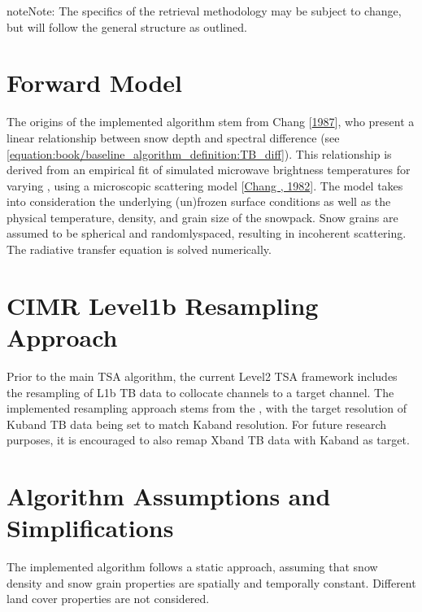 \documentclass[letterpaper,10pt,english]{jupyterBook}
\begin{document}
\begin{sphinxadmonition}{note}{Note:}
\sphinxAtStartPar
The specifics of the retrieval methodology may be subject to change, but will follow the general structure as outlined.
\end{sphinxadmonition}


\section{Forward Model}
\label{\detokenize{book/baseline_algorithm_definition:forward-model}}
\sphinxAtStartPar
The origins of the implemented algorithm stem from Chang  {[}\hyperlink{cite.book/references:id7}{1987}{]}, who present a linear relationship between snow depth and spectral difference (see \eqref{equation:book/baseline_algorithm_definition:TB_diff}).
This relationship is derived from an empirical fit of simulated microwave brightness temperatures for varying {\hyperref[\detokenize{book/acronyms:term-SWE}]{}}, using a microscopic scattering model {[}\hyperlink{cite.book/references:id23}{Chang , 1982}{]}.
The model takes into consideration the underlying (un\sphinxhyphen{})frozen surface conditions as well as the physical temperature, density, and grain size of the snowpack.
Snow grains are assumed to be spherical and randomly\sphinxhyphen{}spaced, resulting in incoherent scattering.
The radiative transfer equation is solved numerically.


\section{CIMR Level\sphinxhyphen{}1b Resampling Approach}
\label{\detokenize{book/baseline_algorithm_definition:cimr-level-1b-resampling-approach}}
\sphinxAtStartPar
Prior to the main TSA algorithm, the current {\hyperref[\detokenize{book/acronyms:term-CIMR}]{}} Level\sphinxhyphen{}2 TSA framework includes the resampling of L1b TB data to collocate channels to a target channel.
The implemented resampling approach stems from the , with the target resolution of Ku\sphinxhyphen{}band TB data being set to match Ka\sphinxhyphen{}band resolution.
For future research purposes, it is encouraged to also remap X\sphinxhyphen{}band TB data with Ka\sphinxhyphen{}band as target.


\section{Algorithm Assumptions and Simplifications}
\label{\detokenize{book/baseline_algorithm_definition:algorithm-assumptions-and-simplifications}}
\sphinxAtStartPar
The implemented algorithm follows a static approach, assuming that snow density and snow grain properties are spatially and temporally constant.
Different land cover properties are not considered.
\end{document}
